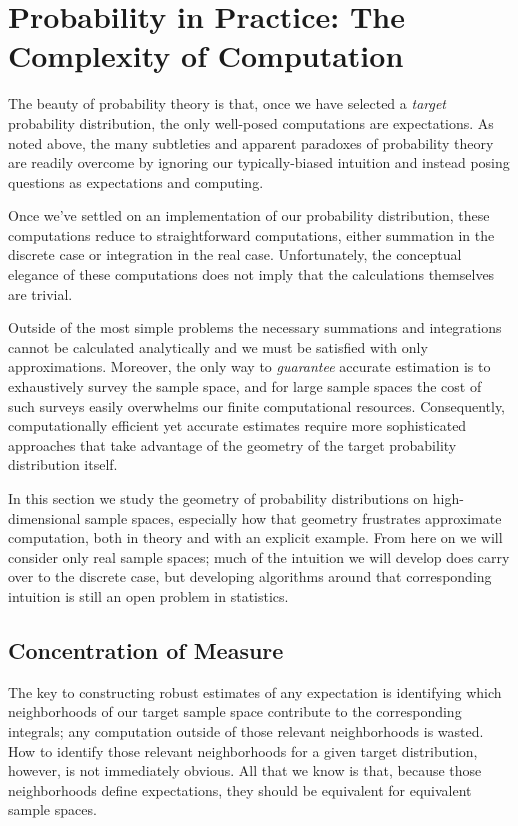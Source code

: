 \chapter{Probability in Practice: The Complexity of Computation}

The beauty of probability theory is that, once we have selected a
\emph{target} probability distribution, the only well-posed computations
are expectations.  As noted above, the many subtleties and apparent 
paradoxes of probability theory are readily overcome by ignoring our
typically-biased intuition and instead posing questions as expectations
and computing.

Once we've settled on an implementation of our probability distribution, 
these computations reduce to straightforward computations, either 
summation in the discrete case or integration in the real case.  
Unfortunately, the conceptual elegance of these computations does not 
imply that the calculations themselves are trivial.  

Outside of the most simple problems the necessary summations and 
integrations cannot be calculated analytically and we must be satisfied 
with only approximations.  Moreover, the only way to \emph{guarantee}
accurate estimation is to exhaustively survey the sample space, and
for large sample spaces the cost of such surveys easily overwhelms our 
finite computational resources.  Consequently, computationally efficient 
yet accurate estimates require more sophisticated approaches that take
advantage of the geometry of the target probability distribution itself.

In this section we study the geometry of probability distributions
on high-dimensional sample spaces, especially how that geometry 
frustrates approximate computation, both in theory and with an explicit 
example.  From here on we will consider only real sample spaces; much 
of the intuition we will develop does carry over to the discrete case, but 
developing algorithms around that corresponding intuition is still an 
open problem in statistics.

\section{Concentration of Measure}

The key to constructing robust estimates of any expectation is identifying 
which neighborhoods of our target sample space contribute to the 
corresponding integrals; any computation outside of those relevant 
neighborhoods is wasted.  How to identify those relevant neighborhoods 
for a given target distribution, however, is not immediately obvious.
All that we know is that, because those neighborhoods define expectations,
they should be equivalent for equivalent sample spaces.

